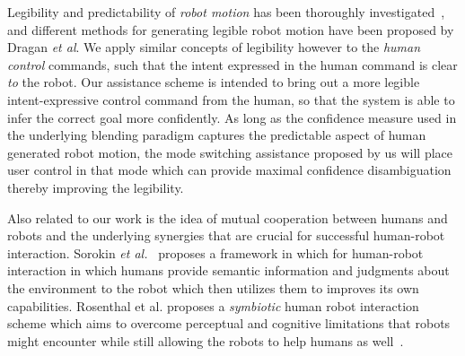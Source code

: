 \documentclass[conference]{IEEEtran}
\begin{document}
Legibility and predictability of \textit{robot motion} has been thoroughly investigated~\cite{dragan2013legibility,dragan2013generating}, and different methods for generating legible robot motion have been proposed by Dragan \textit{et al}. We apply similar concepts of legibility however to the \textit{human control} commands, such that the intent expressed in the human command is clear \textit{to} the robot. Our assistance scheme is intended to bring out a more legible intent-expressive control command from the human, so that the system is able to infer the correct goal more confidently. 
As long as the confidence measure used in the underlying blending paradigm captures the predictable aspect of human generated robot motion, the mode switching assistance proposed by us will place user control in that mode which can provide maximal confidence disambiguation thereby improving the legibility.

Also related to our work is the idea of mutual cooperation between humans and robots and the underlying synergies that are crucial for successful human-robot interaction. Sorokin \textit{et al.}~\cite{sorokin2010people} proposes a framework in which for human-robot interaction in which humans provide semantic information and judgments about the environment to the robot which then utilizes them to improves its own capabilities. Rosenthal et al. proposes a \textit{symbiotic} human robot interaction scheme which aims to overcome perceptual and cognitive limitations that robots might encounter while still allowing the robots to help humans as well~\cite{rosenthal2010effective}. 

%
\end{document}
